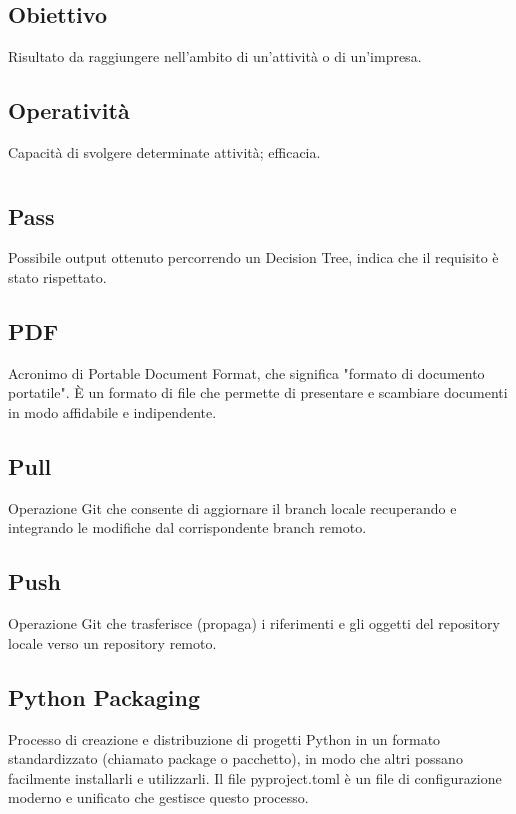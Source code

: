 \documentclass[a4paper,12pt]{article}
\begin{document}
\newpage
      
        \section{}
        
          \subsection*{Obiettivo}
			Risultato da raggiungere nell'ambito di un'attività o di un'impresa.
          \subsection*{Operatività}
			Capacità di svolgere determinate attività; efficacia.
        
\newpage
        \section{}
        
          \subsection*{Pass}
			Possibile output ottenuto percorrendo un Decision Tree, indica che il requisito è stato rispettato.
          \subsection*{PDF}
			Acronimo di Portable Document Format, che significa "formato di documento portatile". È un formato di file che permette di presentare e scambiare documenti in modo affidabile e indipendente.
          \subsection*{Pull}
			Operazione Git che consente di aggiornare il branch locale recuperando e integrando le modifiche dal corrispondente branch remoto.
          \subsection*{Push}
			Operazione Git che trasferisce (propaga) i riferimenti e gli oggetti del repository locale verso un repository remoto.
          \subsection*{Python Packaging}
			Processo di creazione e distribuzione di progetti Python in un formato standardizzato (chiamato package o pacchetto), in modo che altri possano facilmente installarli e utilizzarli. Il file pyproject.toml è un file di configurazione moderno e unificato che gestisce questo processo.
        
\end{document}
